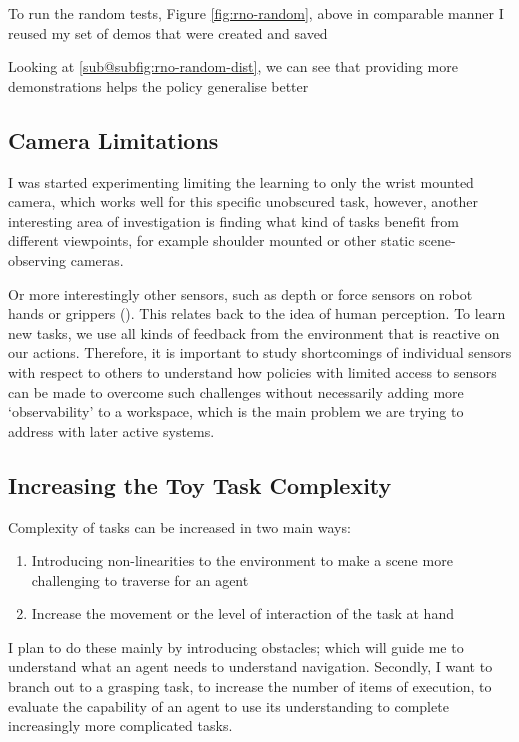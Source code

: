To run the random tests, Figure \ref{fig:rno-random}, above in comparable manner I reused my set of demos that were created and saved 

Looking at \ref{sub@subfig:rno-random-dist}, we can see that providing more demonstrations helps the policy generalise better

\subsection{Camera Limitations}

I was started experimenting limiting the learning to only the wrist mounted camera, which works well for this specific unobscured task, however, another interesting area of investigation is finding what kind of tasks benefit from different viewpoints, for example shoulder mounted or other static scene-observing cameras. 

Or more interestingly other sensors, such as depth or force sensors on robot hands or grippers (). This relates back to the idea of human perception. To learn new tasks, we use all kinds of feedback from the environment that is reactive on our actions. Therefore, it is important to study shortcomings of individual sensors with respect to others to understand how policies with limited access to sensors can be made to overcome such challenges without necessarily adding more `observability' to a workspace, which is the main problem we are trying to address with later active systems.


\subsection{Increasing the Toy Task Complexity}
Complexity of tasks can be increased in two main ways:
\begin{enumerate}
  \item Introducing non-linearities to the environment to make a scene more challenging to traverse for an agent
  \item Increase the movement or the level of interaction of the task at hand
\end{enumerate}
I plan to do these mainly by introducing obstacles; which will guide me to understand what an agent needs to understand navigation. Secondly, I want to branch out to a grasping task, to increase the number of items of execution, to evaluate the capability of an agent to use its understanding to complete increasingly more complicated tasks.

